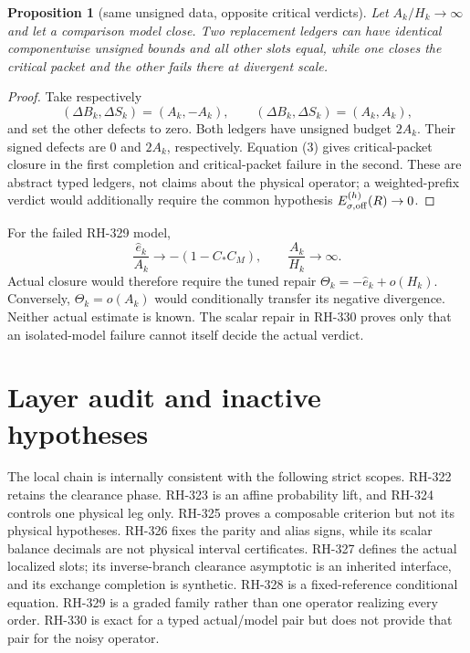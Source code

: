 \documentclass[11pt]{article}
\newtheorem{proposition}[theorem]{Proposition}
\theoremstyle{remark}\newtheorem{remark}[theorem]{Remark}
\newcommand{\Hk}{H_k}
\begin{document}
\begin{proposition}[same unsigned data, opposite critical verdicts]
Let $A_k/\Hk\to\infty$ and let a comparison model close.  Two replacement
ledgers can have identical componentwise unsigned bounds and all other slots
equal, while one closes the critical packet and the other fails there at
divergent scale.
\end{proposition}
\begin{proof}
Take respectively
\[
 (\Delta B_k,\Delta S_k)=(A_k,-A_k),\qquad
 (\Delta B_k,\Delta S_k)=(A_k,A_k),                              \tag{8}
\]
and set the other defects to zero.  Both ledgers have unsigned budget
$2A_k$.  Their signed defects are $0$ and $2A_k$, respectively.  Equation
(3) gives critical-packet closure in the first completion and critical-packet
failure in the second.  These are abstract typed ledgers, not claims about
the physical operator; a weighted-prefix verdict would additionally require
the common hypothesis $E_{\sigma,\rm off}^{(h)}(R)\to0$.
\end{proof}

For the failed RH-329 model,
\[
 \frac{\widehat e_k}{A_k}\longrightarrow-(1-C_*C_M),
 \qquad \frac{A_k}{\Hk}\longrightarrow\infty.                   \tag{9}
\]
Actual closure would therefore require the tuned repair
$\Theta_k=-\widehat e_k+o(\Hk)$.  Conversely,
$\Theta_k=o(A_k)$ would conditionally transfer its negative divergence.
Neither actual estimate is known.  The scalar repair in RH-330 proves only
that an isolated-model failure cannot itself decide the actual verdict.

\section{Layer audit and inactive hypotheses}
The local chain is internally consistent with the following strict scopes.
RH-322 retains the clearance phase.  RH-323 is an affine probability lift,
and RH-324 controls one physical leg only.  RH-325 proves a composable
criterion but not its physical hypotheses.  RH-326 fixes the parity and
alias signs, while its scalar balance decimals are not physical interval
certificates.  RH-327 defines the actual localized slots; its inverse-branch
clearance asymptotic is an inherited interface, and its exchange completion
is synthetic.  RH-328 is a fixed-reference conditional equation.
RH-329 is a graded family rather than one operator realizing every order.
RH-330 is exact for a typed actual/model pair but does not provide that pair
for the noisy operator.
\end{document}
